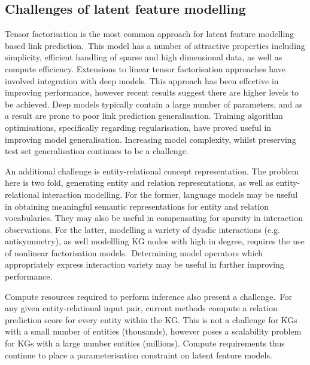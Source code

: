 \subsection{Challenges of latent feature modelling} 

Tensor factorisation is the most common approach for latent feature modelling based link prediction.\ This model has a number of attractive properties including simplicity, efficient handling of sparse and high dimensional data, as well as compute efficiency. Extensions to linear tensor factorisation approaches have involved integration with deep models. This approach has been effective in improving performance, however recent results suggest there are higher levels to be achieved. Deep models typically contain a large number of parameters, and as a result are prone to poor link prediction generalisation. Training algorithm optimisations, specifically regarding regularisation, have proved useful in improving model generalisation. Increasing model complexity, whilst preserving test set generalisation continues to be a challenge. \par

\noindent An additional challenge is entity-relational concept representation. The problem here is two fold, generating entity and relation representations, as well as entity-relational interaction modelling. For the former, language models may be useful in obtaining meaningful semantic representations for entity and relation vocabularies. They may also be useful in compensating for sparsity in interaction observations. For the latter, modelling a variety of dyadic interactions (e.g. antisymmetry), as well modellling KG nodes with high in degree, requires the use of nonlinear factorisation models.\ Determining model operators which appropriately express interaction variety may be useful in further improving performance. \par

\noindent Compute resources required to perform inference also present a challenge.\ For any given entity-relational input pair, current methods compute a relation prediction score for every entity within the KG. This is not a challenge for KGs with a small number of entities (thousands), however poses a scalability problem for KGs with a large number entities (millions). Compute requirements thus continue to place a parameterisation constraint on latent feature models. 



